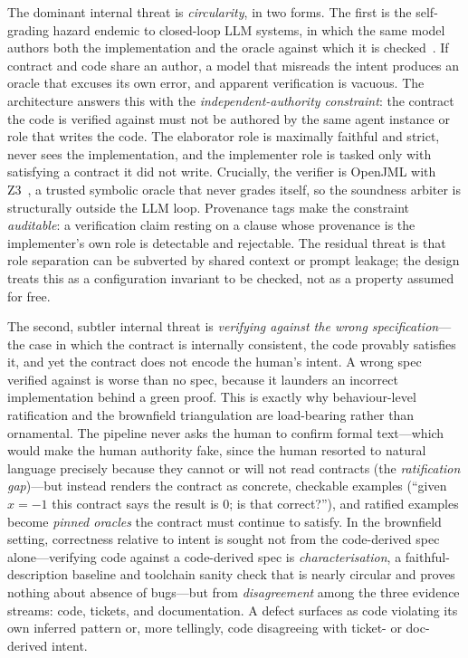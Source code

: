 The dominant internal threat is \emph{circularity}, in two forms. The first is the self-grading hazard endemic to closed-loop LLM systems, in which the same model authors both the implementation and the oracle against which it is checked~\cite{liu2026oracle,sun2024clover}. If contract and code share an author, a model that misreads the intent produces an oracle that excuses its own error, and apparent verification is vacuous. The architecture answers this with the \emph{independent-authority constraint}: the contract the code is verified against must not be authored by the same agent instance or role that writes the code. The elaborator role is maximally faithful and strict, never sees the implementation, and the implementer role is tasked only with satisfying a contract it did not write. Crucially, the verifier is OpenJML with Z3~\cite{cok2014openjml,demoura2008z3}, a trusted symbolic oracle that never grades itself, so the soundness arbiter is structurally outside the LLM loop. Provenance tags make the constraint \emph{auditable}: a verification claim resting on a clause whose provenance is the implementer's own role is detectable and rejectable. The residual threat is that role separation can be subverted by shared context or prompt leakage; the design treats this as a configuration invariant to be checked, not as a property assumed for free.

The second, subtler internal threat is \emph{verifying against the wrong specification}---the case in which the contract is internally consistent, the code provably satisfies it, and yet the contract does not encode the human's intent. A wrong spec verified against is worse than no spec, because it launders an incorrect implementation behind a green proof. This is exactly why behaviour-level ratification and the brownfield triangulation are load-bearing rather than ornamental. The pipeline never asks the human to confirm formal text---which would make the human authority fake, since the human resorted to natural language precisely because they cannot or will not read contracts (the \emph{ratification gap})---but instead renders the contract as concrete, checkable examples (``given $x=-1$ this contract says the result is $0$; is that correct?''), and ratified examples become \emph{pinned oracles} the contract must continue to satisfy. In the brownfield setting, correctness relative to intent is sought not from the code-derived spec alone---verifying code against a code-derived spec is \emph{characterisation}, a faithful-description baseline and toolchain sanity check that is nearly circular and proves nothing about absence of bugs---but from \emph{disagreement} among the three evidence streams: code, tickets, and documentation. A defect surfaces as code violating its own inferred pattern or, more tellingly, code disagreeing with ticket- or doc-derived intent.

